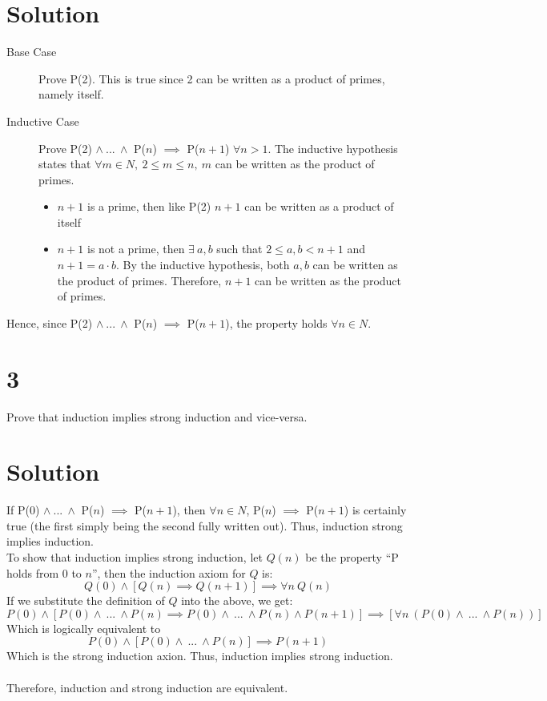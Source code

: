 \documentclass{article}
\begin{document}
\section*{Solution}

\begin{description}
\item[Base Case] Prove P(2). This is true since 2 can be written as a product of primes, namely itself.
\item[Inductive Case] Prove P(2) $\land \ ...\ \land$ P($n$) $\implies$ P($n+1$) $\forall n > 1$. The inductive hypothesis states that $\forall m \in N,\ 2 \leq m \leq n,\ m$ can be written as the product of primes.
	\begin{itemize}
	\item $n+1$ is a prime, then like P(2) $n+1$ can be written as a product of itself
	\item $n+1$ is not a prime, then $\exists \ a, b$ such that $2 \leq a,b < n+1$ and $n+1 = a\cdot b$. By the inductive hypothesis, both $a,b$ can be written as the product of primes. Therefore, $n+1$ can be written as the product of primes.
	\end{itemize}
\end{description}
Hence, since P(2) $\land \ ...\ \land$ P($n$) $\implies$ P($n+1$), the property holds $\forall n \in N$.

\newpage

\section*{3}
Prove that induction implies strong induction and vice-versa.


\section*{Solution}
If P(0) $\land \ ...\ \land$ P($n$) $\implies$ P($n+1$), then $\forall n \in N$, P($n$) $\implies$ P($n+1$) is certainly true (the first simply being the second fully written out). Thus, induction strong implies induction.\\
To show that induction implies strong induction, let $Q(n)$ be the property ``P holds from 0 to $n$'', then the induction axiom for $Q$ is:
\[
Q(0) \land [Q(n) \implies Q(n+1)] \implies \forall n\ Q(n)
\]
If we substitute the definition of $Q$ into the above, we get:
\[ 
P(0) \land [P(0)\land \ ...\ \land P(n) \implies P(0)\land \ ...\ \land P(n) \land P(n+1)] \implies [\forall n\ (P(0)\land \ ...\ \land P(n))]
\]
Which is logically equivalent to
\[ 
P(0) \land [P(0)\land \ ...\ \land P(n)] \implies P(n+1)
\]
Which is the strong induction axion. Thus, induction implies strong induction.\\\\
Therefore, induction and strong induction are equivalent.
\end{document}
